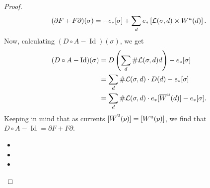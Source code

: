 \begin{proof}
    \[
        (\partial F + F \partial)(\sigma) = -e_* [\sigma] +\sum_{d} e_*\left[\mathcal L(\sigma, d) \times W^u(d)\right].
    \]
    Now, calculating $(D  \circ A - \operatorname{Id})(\sigma)$, we get
    \begin{align*}
        (D  \circ A - \operatorname{Id})(\sigma) &=
        D\left(\sum_d \# \mathcal L(\sigma, d) d\right) - e_*[\sigma]\\
        &= \sum_d \# \mathcal L(\sigma, d) \cdot D(d) - e_*[\sigma]\\
        &= \sum_d \# \mathcal L(\sigma, d) \cdot e_*[\overline{W}^u(d)] - e_*[\sigma]
    .\end{align*} 
    Keeping in mind that as currents $[\overline{W}^u(p)] = [W^u(p)]$, we find that $D  \circ  A - \operatorname{Id} = \partial F + F \partial$.

    \begin{itemize}
        \item {}
        \item {}
        \item {}
    \end{itemize}
\end{proof}
